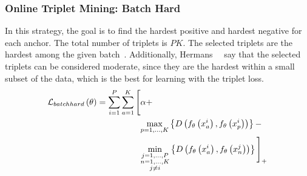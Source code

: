 \subsubsection{Online Triplet Mining: Batch Hard}

In this strategy, the goal is to find the hardest positive and hardest negative for each anchor. The total number of triplets is $PK$. The selected triplets are the hardest among the given batch~\cite{hermans2017triplet}. Additionally, Hermans~\etal{}~\cite{hermans2017triplet} say that the selected triplets can be considered moderate, since they are the hardest within a small subset of the data, which is the best for learning with the triplet loss.
\begin{equation}
    \begin{aligned}
        {\mathcal{L}_{batchhard}} \left( \theta \right) =
        \sum_{i = 1}^P
        \sum_{a = 1}^K
        \Bigg[
         & \alpha +                            \\
         & \underset{p = 1, \dots, K} {\max}
        \left\{ {
            {D} \left( 
                {f_\theta} \left( x_a^i \right),
                {f_\theta} \left( x_p^i \right)
             \right)
        } \right\} -                                    \\
         & \underset{\substack{j = 1, \dots, P \\n = 1, \dots, K\\j \neq i}} {\min}
        \left\{ {
            {D} \left( 
                {f_\theta} \left( x_a^i \right),
                {f_\theta} \left( x_n^j \right)
             \right)
        } \right\}
        {\Bigg]}_{+}
    \end{aligned}
\end{equation}
